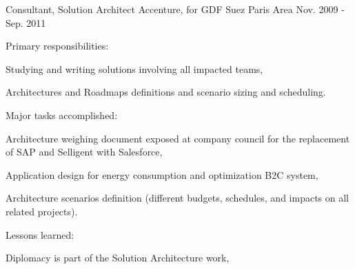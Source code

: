 \begin{cventries}
  \cventry
    {Consultant, Solution Architect} %
    {Accenture, for GDF Suez} %
    {Paris Area} %
    {Nov. 2009 - Sep. 2011} %
    {
      \begin{cvitems} %
        \item {Primary responsibilities:}
        \begin{cvsubitems}
          \item {Studying and writing solutions involving all impacted teams,}
          \item {Architectures and Roadmaps definitions and scenario sizing and scheduling.}
        \end{cvsubitems}
        \item {Major tasks accomplished:}
        \begin{cvsubitems}
          \item {Architecture weighing document exposed at company council for the replacement of SAP and Selligent with Salesforce,}
          \item {Application design for energy consumption and optimization B2C system,}
          \item {Architecture scenarios definition (different budgets, schedules, and impacts on all related projects).}
        \end{cvsubitems}
        \item {Lessons learned:}
        \begin{cvsubitems}
          \item {Diplomacy is part of the Solution Architecture work,}
        \end{cvsubitems}
      \end{cvitems}
    }


\end{cventries}
